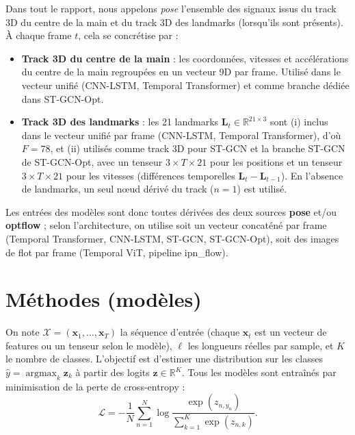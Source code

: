\documentclass[11pt,a4paper]{article}
\begin{document}
Dans tout le rapport, nous appelons \emph{pose} l’ensemble des signaux issus du track 3D du centre de la main et du track 3D des landmarks (lorsqu’ils sont présents). À chaque frame $t$, cela se concrétise par :
\begin{itemize}
  \item \textbf{Track 3D du centre de la main} : les coordonnées, vitesses et accélérations du centre de la main regroupées en un vecteur 9D par frame. Utilisé dans le vecteur unifié (CNN-LSTM, Temporal Transformer) et comme branche dédiée dans ST-GCN-Opt.
  \item \textbf{Track 3D des landmarks} : les 21 landmarks $\mathbf{L}_t \in \mathbb{R}^{21 \times 3}$ sont (i) inclus dans le vecteur unifié par frame (CNN-LSTM, Temporal Transformer), d'où $F=78$, et (ii) utilisés comme track 3D pour ST-GCN et la branche ST-GCN de ST-GCN-Opt, avec un tenseur $3 \times T \times 21$ pour les positions et un tenseur $3 \times T \times 21$ pour les vitesses (différences temporelles $\mathbf{L}_t - \mathbf{L}_{t-1}$). En l’absence de landmarks, un seul nœud dérivé du track ($n=1$) est utilisé.
\end{itemize}

Les entrées des modèles sont donc toutes dérivées des deux sources \textbf{pose} et/ou \textbf{optflow} ; selon l’architecture, on utilise soit un vecteur concaténé par frame (Temporal Transformer, CNN-LSTM, ST-GCN, ST-GCN-Opt), soit des images de flot par frame (Temporal ViT, pipeline ipn\_flow).

\section{Méthodes (modèles)}
\label{sec:methods}

On note $\mathcal{X} = (\mathbf{x}_1, \ldots, \mathbf{x}_T)$ la séquence d’entrée (chaque $\mathbf{x}_t$ est un vecteur de features ou un tenseur selon le modèle), $\ell$ les longueurs réelles par sample, et $K$ le nombre de classes. L’objectif est d’estimer une distribution sur les classes $\hat{y} = \operatorname{argmax}_k \mathbf{z}_k$ à partir des logits $\mathbf{z} \in \mathbb{R}^K$. Tous les modèles sont entraînés par minimisation de la perte de cross-entropy :
\begin{equation}
  \mathcal{L} = -\frac{1}{N}\sum_{n=1}^{N} \log \frac{\exp(z_{n,y_n})}{\sum_{k=1}^{K} \exp(z_{n,k})}.
\end{equation}
\end{document}
